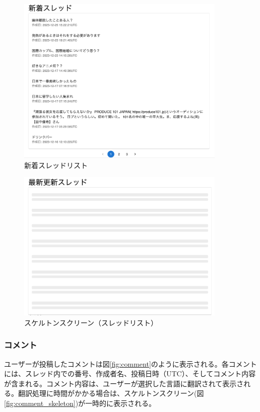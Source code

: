 \documentclass[b5paper,12pt,dvipdfmx]{jsreport}
\begin{document}
\begin{figure}[H]
	\centering
    \includegraphics[width=100mm,height=81.00mm]{./img/feature/new_thread_list.png}
	\caption{新着スレッドリスト}
	\label{fig:new_thread_list}
\end{figure}

\begin{figure}[H]
	\centering
    \includegraphics[width=100mm,height=72.70mm]{./img/feature/thread_list_skeleton.png}
	\caption{スケルトンスクリーン（スレッドリスト）}
	\label{fig:thread_list_skeleton}
\end{figure}

\subsubsection{コメント}
ユーザーが投稿したコメントは図\ref{fig:comment}のように表示される。各コメントには、スレッド内での番号、作成者名、投稿日時（UTC）、そしてコメント内容が含まれる。コメント内容は、ユーザーが選択した言語に翻訳されて表示される。翻訳処理に時間がかかる場合は、スケルトンスクリーン(図\ref{fig:comment_skeleton})が一時的に表示される。
\end{document}
